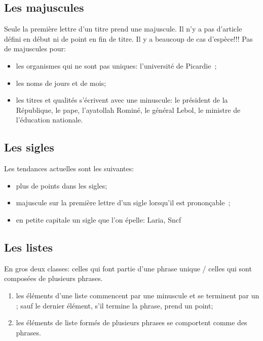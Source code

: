 \documentclass[twoside]{article}
\begin{document}
\subsection{Les majuscules} 

Seule la premi\`ere lettre d'un titre prend une majuscule. Il n'y a
pas d'article d\'efini en d\'ebut ni de point en fin de titre.  Il y a
beaucoup de cas d'esp\`ece!!! Pas de majuscules pour:

\begin{itemize}

\item les organismes qui ne sont pas uniques: l'universit\'e de Picardie~;

\item les noms de jours et de mois;

\item les titres et qualit\'es s'\'ecrivent avec une minuscule: le
pr\'esident de la R\'epublique, le pape, l'ayatollah Romin\'e, le g\'en\'eral
Lebol, le ministre de l'\'education nationale.

\end{itemize}

\subsection{Les sigles} 

Les tendances actuelles sont les suivantes:

\begin{itemize}

\item plus de points dans les sigles;

\item  majuscule sur la premi\`ere lettre d'un sigle lorsqu'il
est pronon\-\c ca\-ble~;

\item en petite capitale un sigle que l'on \'epelle: Laria, {\sc Sncf}

\end{itemize}

\subsection{Les listes} 

En gros deux classes: celles qui font partie d'une phrase unique /
celles qui sont compos\'ees de plusieurs phrases.

\begin{enumerate}

\item les \'el\'ements d'une liste commencent par une minuscule et se
terminent par un ; sauf le dernier \'el\'ement, s'il termine la
phrase, prend un point;

\item les \'el\'ements de liste form\'es de plusieurs phrases se comportent
comme des phrases.

\end{enumerate}
\end{document}
